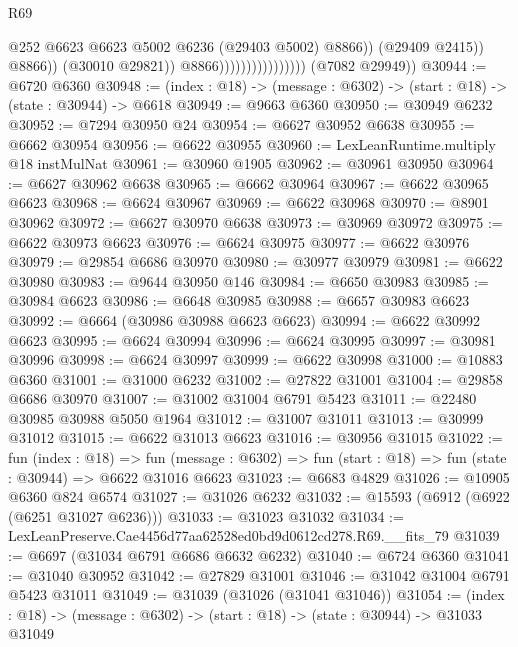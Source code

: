 \begin{lexlean}{R69}
\begin{coremodule}
{                                                  @252
                                                  @6623
                                                  @6623
                                                  @5002
                                                  @6236
                                                  (@29403 @5002)
                                                  @8866))
                                              (@29409 @2415))
                                            @8866))
                                        (@30010 @29821))
                                      @8866))))))))))))))))
      (@7082 @29949))
@30944 := @6720 @6360
@30948 := (index : @18) -> (message : @6302) -> (start : @18) -> (state : @30944) -> @6618
@30949 := @9663 @6360
@30950 := @30949 @6232
@30952 := @7294 @30950 @24
@30954 := @6627 @30952 @6638
@30955 := @6662 @30954
@30956 := @6622 @30955
@30960 := LexLeanRuntime.multiply @18 instMulNat
@30961 := @30960 @1905
@30962 := @30961 @30950
@30964 := @6627 @30962 @6638
@30965 := @6662 @30964
@30967 := @6622 @30965 @6623
@30968 := @6624 @30967
@30969 := @6622 @30968
@30970 := @8901 @30962
@30972 := @6627 @30970 @6638
@30973 := @30969 @30972
@30975 := @6622 @30973 @6623
@30976 := @6624 @30975
@30977 := @6622 @30976
@30979 := @29854 @6686 @30970
@30980 := @30977 @30979
@30981 := @6622 @30980
@30983 := @9644 @30950 @146
@30984 := @6650 @30983
@30985 := @30984 @6623
@30986 := @6648 @30985
@30988 := @6657 @30983 @6623
@30992 := @6664 (@30986 @30988 @6623 @6623)
@30994 := @6622 @30992 @6623
@30995 := @6624 @30994
@30996 := @6624 @30995
@30997 := @30981 @30996
@30998 := @6624 @30997
@30999 := @6622 @30998
@31000 := @10883 @6360
@31001 := @31000 @6232
@31002 := @27822 @31001
@31004 := @29858 @6686 @30970
@31007 := @31002 @31004 @6791 @5423
@31011 := @22480 @30985 @30988 @5050 @1964
@31012 := @31007 @31011
@31013 := @30999 @31012
@31015 := @6622 @31013 @6623
@31016 := @30956 @31015
@31022 := fun (index : @18) =>
  fun (message : @6302) => fun (start : @18) => fun (state : @30944) => @6622 @31016 @6623
@31023 := @6683 @4829
@31026 := @10905 @6360 @824 @6574
@31027 := @31026 @6232
@31032 := @15593 (@6912 (@6922 (@6251 @31027 @6236)))
@31033 := @31023 @31032
@31034 := LexLeanPreserve.Cae4456d77aa62528ed0bd9d0612cd278.R69.__fits_79
@31039 := @6697 (@31034 @6791 @6686 @6632 @6232)
@31040 := @6724 @6360
@31041 := @31040 @30952
@31042 := @27829 @31001
@31046 := @31042 @31004 @6791 @5423 @31011
@31049 := @31039 (@31026 (@31041 @31046))
@31054 := (index : @18) -> (message : @6302) -> (start : @18) -> (state : @30944) -> @31033 @31049
}
\end{coremodule}
\end{lexlean}
